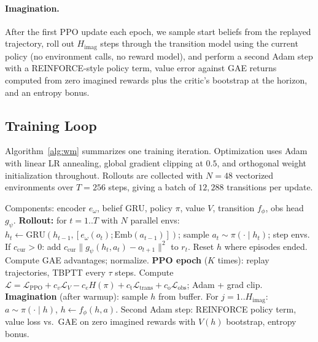 \documentclass[letterpaper]{article}
\begin{document}
\paragraph{Imagination.}
After the first PPO update each epoch, we sample start beliefs from the
replayed trajectory, roll out $H_{\text{imag}}$ steps through the transition
model using the current policy (no environment calls, no reward model),
and perform a second Adam step with a REINFORCE-style policy term,
value error against GAE returns computed from zero imagined rewards plus
the critic's bootstrap at the horizon, and an entropy bonus.

\subsection{Training Loop}

Algorithm~\ref{alg:wm} summarizes one training iteration. Optimization uses
Adam with linear LR annealing, global gradient clipping at $0.5$, and
orthogonal weight initialization throughout. Rollouts are collected with
$N = 48$ vectorized environments over $T = 256$ steps, giving a batch of
$12{,}288$ transitions per update.

\begin{algorithm}[!tbp]
\caption{World Model Agent --- one training update}
\label{alg:wm}
\begin{algorithmic}[1]
\State Components: encoder $e_\omega$, belief $\mathrm{GRU}$, policy $\pi$,
value $V$, transition $f_\phi$, obs head $g_\psi$.
\State \textbf{Rollout:} for $t = 1..T$ with $N$ parallel envs:
\State \quad $h_t \gets \mathrm{GRU}(h_{t-1},[e_\omega(o_t);\mathrm{Emb}(a_{t-1})])$;
sample $a_t \sim \pi(\cdot\mid h_t)$; step envs.
\State \quad If $c_\text{cur}>0$: add
$c_\text{cur}\lVert g_\psi(h_t,a_t)-o_{t+1}\rVert^2$ to $r_t$.
\State \quad Reset $h$ where episodes ended.
\State Compute GAE advantages; normalize.
\State \textbf{PPO epoch} ($K$ times): replay trajectories, TBPTT every $\tau$ steps.
\State \quad Compute
$\mathcal{L} = \mathcal{L}_{\text{PPO}} + c_v\mathcal{L}_V - c_e H(\pi)
  + c_\text{t}\mathcal{L}_{\text{trans}} + c_\text{o}\mathcal{L}_{\text{obs}}$;
Adam + grad clip.
\State \textbf{Imagination} (after warmup): sample $h$ from buffer.
\State \quad For $j = 1..H_{\text{imag}}$: $a\sim\pi(\cdot\mid h)$,
$h \gets f_\phi(h, a)$.
\State \quad Second Adam step: REINFORCE policy term, value loss vs.\ GAE
on zero imagined rewards with $V(h)$ bootstrap, entropy bonus.
\end{algorithmic}
\end{algorithm}
\end{document}
